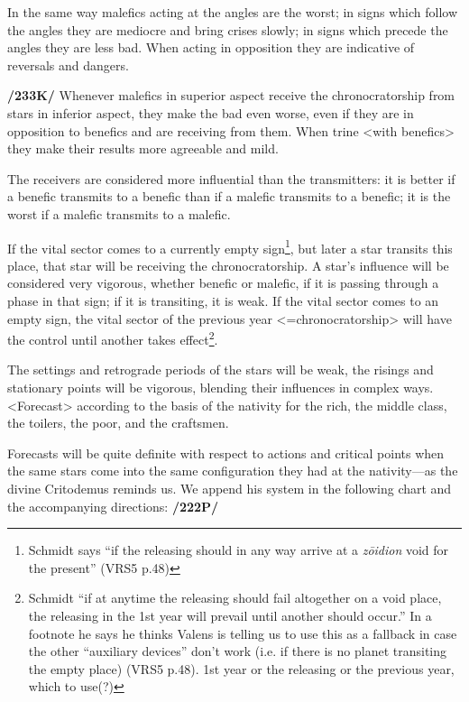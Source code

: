 In the same way malefics acting at the angles are the worst; in signs which follow the angles they are mediocre and bring crises slowly; in signs which precede the angles they are less bad. When acting in opposition they are indicative of reversals and dangers.

\textbf{/233K/} Whenever malefics in superior aspect receive the chronocratorship from stars in inferior aspect, they make the bad even worse, even if they are in opposition to benefics and are receiving from them. When trine <with benefics> they make their results more agreeable and mild. 

The \mndl receivers are considered more influential than the transmitters: it is better if a benefic transmits to a benefic than if a malefic transmits to a benefic; it is the worst if a malefic transmits to a malefic. 

If the vital sector comes to a currently empty sign\footnote{Schmidt says ``if the releasing should in any way arrive at a \textsl{z\={o}idion} void for the present'' (VRS5 p.48)}, but later a star transits this place, that star will be receiving the chronocratorship. A
star’s influence will be considered very vigorous, whether benefic or malefic, if it is passing through a phase in that sign; if it is transiting, it is weak. If the vital sector comes to an empty sign, the vital sector of the previous year <=chronocratorship> will have the control until another takes effect\footnote{Schmidt ``if at anytime the releasing should fail altogether on a void place, the releasing in the 1st year will prevail until another should occur.'' In a footnote he says he thinks Valens is telling us to use this as a fallback in case the other ``auxiliary devices'' don't work (i.e. if there is no planet transiting the empty place) (VRS5 p.48). 1st year or the releasing or the previous year, which to use(?)}.

The settings and retrograde periods of the stars will be weak, the risings and stationary points will be vigorous, blending their influences in complex ways. <Forecast> according to the basis of the nativity for the rich, the middle class, the toilers, the poor, and the craftsmen.

Forecasts will be quite definite with respect to actions and critical points when the same stars come into the same configuration they had at the nativity—as the divine Critodemus reminds us. We append his system in the following chart and the accompanying directions: \textbf{/222P/}

